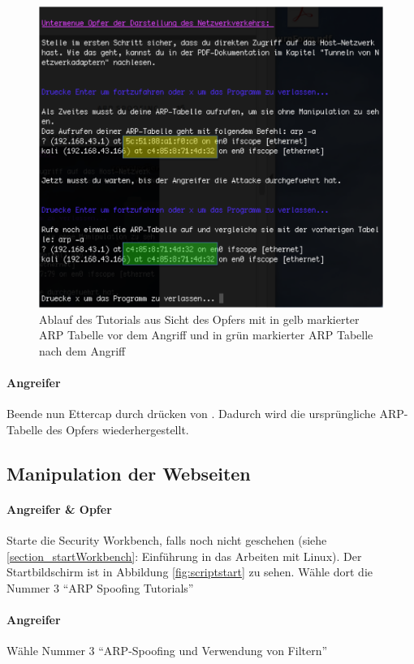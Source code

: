  \begin{figure}
	\centering
	\includegraphics[width=\textwidth]{images/ARP_Spoofing/NetzwerkverkehrOpfer}
	\caption{Ablauf des Tutorials aus Sicht des Opfers mit in gelb markierter ARP Tabelle vor dem Angriff und in grün markierter ARP Tabelle nach dem Angriff}
	\label{fig:netzwerkverkehropfer}
\end{figure}

\paragraph{Angreifer} Beende nun Ettercap durch drücken von . Dadurch wird die ursprüngliche ARP-Tabelle des Opfers wiederhergestellt.

\subsection{Manipulation der Webseiten}
\paragraph{Angreifer \& Opfer} Starte die Security Workbench, falls noch nicht geschehen (siehe \ref{section_startWorkbench}: Einführung in das Arbeiten mit Linux). Der Startbildschirm ist in Abbildung \ref{fig:scriptstart} zu sehen. Wähle dort die Nummer 3 \enquote{ARP Spoofing Tutorials}

\paragraph{Angreifer} Wähle Nummer 3 \enquote{ARP-Spoofing und Verwendung von Filtern}

